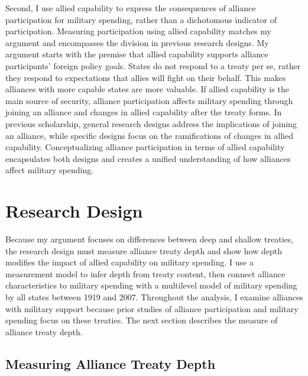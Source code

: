 \documentclass[12pt]{article}
\begin{document}
Second, I use allied capability to express the consequences of alliance participation for military spending, rather than a dichotomous indicator of participation.
Measuring participation using allied capability matches my argument and encompasses the division in  previous research designs. 
My argument starts with the premise that allied capability supports alliance participants' foreign policy goals. 
States do not respond to a treaty per se, rather they respond to expectations that allies will fight on their behalf.
This makes alliances with more capable states are more valuable.
If allied capability is the main source of security, alliance participation affects military spending through joining an alliance and changes in allied capability after the treaty forms. 
In previous scholarship, general research designs address the implications of joining an alliance, while specific designs focus on the ramifications of changes in allied capability. 
Conceptualizing alliance participation in terms of allied capability encapsulates both designs and creates a unified understanding of how alliances affect military spending. 



\section{Research Design} 


Because my argument focuses on differences between deep and shallow treaties, the research design must measure alliance treaty depth and show how depth modifies the impact of allied capability on military spending.  
I use a measurement model to infer depth from treaty content, then connect alliance characteristics to military spending with a multilevel model of military spending by all states between 1919 and 2007. 
Throughout the analysis, I examine alliances with military support because prior studies of alliance participation and military spending focus on these treaties.
The next section describes the measure of alliance treaty depth. 


\subsection{Measuring Alliance Treaty Depth} 
\end{document}
